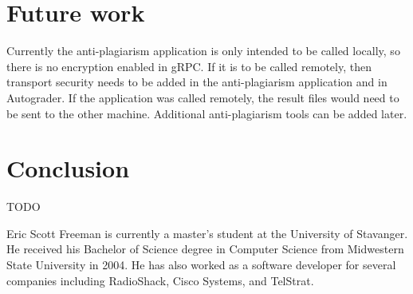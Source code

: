 \documentclass[10pt,journal,compsoc]{IEEEtran}
\begin{document}
	\section{Future work}
	Currently the anti-plagiarism application is only intended to be called locally, so there is no encryption enabled in gRPC. If it is to be called remotely, then transport security needs to be added in the anti-plagiarism application and in Autograder. If the application was called remotely, the result files would need to be sent to the other machine. Additional anti-plagiarism tools can be added later.
	
	\section{Conclusion}
	TODO
	
	
	

\begin{IEEEbiographynophoto}{Eric Scott Freeman}
is currently a master's student at the University of Stavanger. He received his Bachelor of Science degree in Computer Science from Midwestern State University in 2004. He has also worked as a software developer for several companies including RadioShack, Cisco Systems, and TelStrat.
\end{IEEEbiographynophoto}
\end{document}
